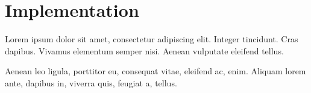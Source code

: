\section{Implementation}

Lorem ipsum dolor sit amet, consectetur adipiscing elit. Integer tincidunt. Cras dapibus. Vivamus elementum semper nisi. Aenean vulputate eleifend tellus.

Aenean leo ligula, porttitor eu, consequat vitae, eleifend ac, enim. Aliquam lorem ante, dapibus in, viverra quis, feugiat a, tellus.
